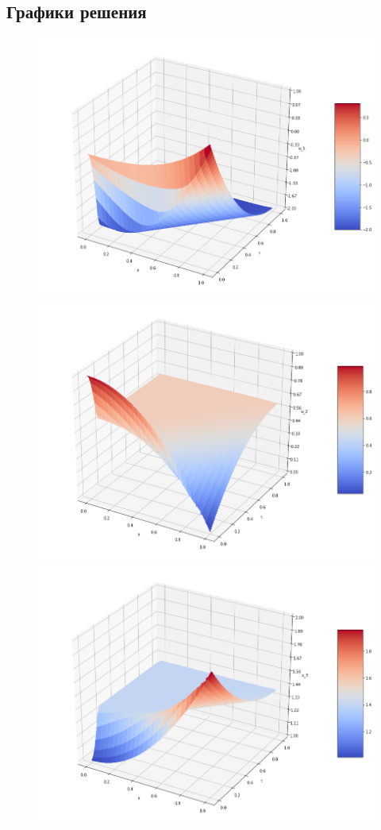 \documentclass[a4paper,14pt]{article}
\begin{document}
    \subsection{Графики решения}
\begin{figure}[h]
		\begin{center}
			\includegraphics[scale=0.35]{graph1}
			\includegraphics[scale=0.35]{graph2}      
			\includegraphics[scale=0.35]{graph3}

\end{center}
\end{figure}
\end{document}
